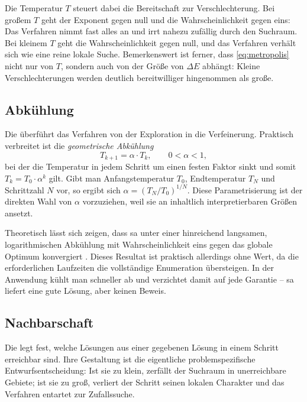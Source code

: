 Die Temperatur $T$ steuert dabei die Bereitschaft zur Verschlechterung. Bei
großem $T$ geht der Exponent gegen null und die Wahrscheinlichkeit gegen eins:
Das Verfahren nimmt fast alles an und irrt nahezu zufällig durch den Suchraum.
Bei kleinem $T$ geht die Wahrscheinlichkeit gegen null, und das Verfahren
verhält sich wie eine reine lokale Suche. Bemerkenswert ist ferner, dass
\eqref{eq:metropolis} nicht nur von $T$, sondern auch von der Größe von $\Delta
E$ abhängt: Kleine Verschlechterungen werden deutlich bereitwilliger
hingenommen als große.

\subsection{Abkühlung}

Die  überführt das Verfahren von der Exploration in die
Verfeinerung. Praktisch verbreitet ist die \emph{geometrische Abkühlung}
\begin{equation}
  T_{k+1} = \alpha \cdot T_k, \qquad 0 < \alpha < 1,
  \label{eq:abkuehlung}
\end{equation}
bei der die Temperatur in jedem Schritt um einen festen Faktor sinkt und somit
$T_k = T_0 \cdot \alpha^k$ gilt. Gibt man Anfangstemperatur $T_0$,
Endtemperatur $T_N$ und Schrittzahl $N$ vor, so ergibt sich $\alpha =
(T_N/T_0)^{1/N}$. Diese Parametrisierung ist der direkten Wahl von $\alpha$
vorzuziehen, weil sie an inhaltlich interpretierbaren Größen ansetzt.

Theoretisch lässt sich zeigen, dass \ac{sa} unter einer hinreichend langsamen,
logarithmischen Abkühlung mit Wahrscheinlichkeit eins gegen das globale Optimum
konvergiert \parencite{laarhoven1987simulated}. Dieses Resultat ist praktisch
allerdings ohne Wert, da die erforderlichen Laufzeiten die vollständige
Enumeration übersteigen. In der Anwendung kühlt man schneller ab und verzichtet
damit auf jede Garantie -- \ac{sa} liefert eine gute Lösung, aber keinen Beweis.

\subsection{Nachbarschaft}

Die  legt fest, welche Lösungen aus einer gegebenen Lösung
in einem Schritt erreichbar sind. Ihre Gestaltung ist die eigentliche
problemspezifische Entwurfsentscheidung: Ist sie zu klein, zerfällt der
Suchraum in unerreichbare Gebiete; ist sie zu groß, verliert der Schritt seinen
lokalen Charakter und das Verfahren entartet zur Zufallssuche.

